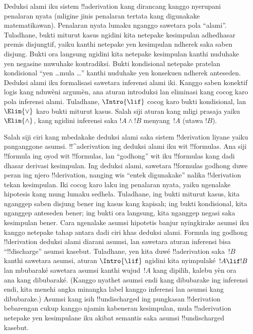 \documentclass[../../../include/open-logic-section]{subfiles}
\begin{document}
      {}
      {}


Deduksi alami iku sistem !!a{derivation} kang dirancang kanggo
nyerupani penalaran nyata (mligine jinis penalaran tertata kang
digunakake matematikawan). Penalaran nyata lumaku nganggo sawetara
pola ``alami''. Tuladhane, bukti miturut kasus ngidini kita netepake
kesimpulan adhedhasar premis disjungtif, yaiku kanthi netepake yen
kesimpulan ndherek saka saben disjung. Bukti ora langsung ngidini kita
netepake kesimpulan kanthi nuduhake yen negasine nuwuhake kontradiksi.
Bukti kondisional netepake pratelan kondisional ``yen \dots mula
\dots'' kanthi nuduhake yen konsekuen ndherek anteseden. Deduksi
alami iku formalisasi sawetara inferensi alami iki. Kanggo saben konektif logis kang nduwèni argumèn,
ana aturan introduksi lan eliminasi kang cocog karo pola inferensi
alami. Tuladhane, $\Intro{\lif}$ cocog karo bukti kondisional, lan
$\Elim{\lor}$ karo bukti miturut kasus. Salah siji aturan kang mligi
prasaja yaiku $\Elim{\land}$, kang ngidini inferensi saka $!A \land !B$
menyang~$!A$ (utawa $!B$).

Salah siji ciri kang mbedakake deduksi alami saka sistem
!!{derivation} liyane yaiku panganggone asumsi. !!^a{derivation} ing
deduksi alami iku wit !!{formula}s. Ana siji !!{formula} ing oyod wit
!!{formula}s, lan ``godhong'' wit iku !!{formula}s kang dadi dhasar
derivasi kesimpulan. Ing deduksi alami, sawetara !!{formula}s godhong
duwe peran ing njero !!{derivation}, nanging wis ``entek digunakake''
nalika !!{derivation} tekan kesimpulan. Iki cocog karo laku ing
penalaran nyata, yaiku ngenalake hipotesis kang mung lumaku sedhela.
Tuladhane, ing bukti miturut kasus, kita nganggep saben disjung bener ing kasus kang kapisah;
ing bukti kondisional, kita nganggep anteseden bener; ing bukti ora
langsung, kita nganggep negasi saka kesimpulan bener. Cara ngenalake
asumsi hipotetis banjur nyingkirake asumsi iku kanggo netepake tahap
antara dadi ciri khas deduksi alami. Formula ing godhong
!!{derivation} deduksi alami diarani asumsi, lan sawetara aturan
inferensi bisa ``!!{discharge}'' asumsi kasebut. Tuladhane, yen kita
duwé !!a{derivation} saka~$!B$ kanthi sawetara asumsi, aturan
$\Intro{\lif}$ ngidini kita nyimpulaké~$!A \lif !B$ lan mbubaraké
sawetara asumsi kanthi wujud~$!A$ kang dipilih, kalebu yèn ora ana kang dibubaraké. (Kanggo nyathet asumsi
endi kang dibubarake ing inferensi endi, kita menehi angka minangka
label kanggo inferensi lan asumsi kang dibubarake.) Asumsi kang isih
!!{undischarged} ing pungkasan !!{derivation} bebarengan cukup kanggo
njamin kabeneran kesimpulan, mula !!a{derivation} netepake yen
kesimpulane iku akibat semantis saka asumsi !!{undischarged} kasebut.
\end{document}
